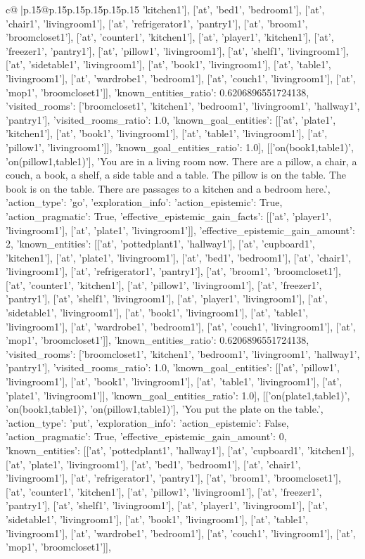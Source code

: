 \documentclass{article}
\begin{document}
{\begin{supertabular}{c@{$\;$}|p{.15\linewidth}@{}p{.15\linewidth}p{.15\linewidth}p{.15\linewidth}p{.15\linewidth}p{.15\linewidth}}
{{{'kitchen1'], ['at', 'bed1', 'bedroom1'], ['at', 'chair1', 'livingroom1'], ['at', 'refrigerator1', 'pantry1'], ['at', 'broom1', 'broomcloset1'], ['at', 'counter1', 'kitchen1'], ['at', 'player1', 'kitchen1'], ['at', 'freezer1', 'pantry1'], ['at', 'pillow1', 'livingroom1'], ['at', 'shelf1', 'livingroom1'], ['at', 'sidetable1', 'livingroom1'], ['at', 'book1', 'livingroom1'], ['at', 'table1', 'livingroom1'], ['at', 'wardrobe1', 'bedroom1'], ['at', 'couch1', 'livingroom1'], ['at', 'mop1', 'broomcloset1']], 'known_entities_ratio': 0.6206896551724138, 'visited_rooms': ['broomcloset1', 'kitchen1', 'bedroom1', 'livingroom1', 'hallway1', 'pantry1'], 'visited_rooms_ratio': 1.0, 'known_goal_entities': [['at', 'plate1', 'kitchen1'], ['at', 'book1', 'livingroom1'], ['at', 'table1', 'livingroom1'], ['at', 'pillow1', 'livingroom1']], 'known_goal_entities_ratio': 1.0}}], [['on(book1,table1)', 'on(pillow1,table1)'], 'You are in a living room now. There are a pillow, a chair, a couch, a book, a shelf, a side table and a table. The pillow is on the table. The book is on the table. There are passages to a kitchen and a bedroom here.', {'action_type': 'go', 'exploration_info': {'action_epistemic': True, 'action_pragmatic': True, 'effective_epistemic_gain_facts': [['at', 'player1', 'livingroom1'], ['at', 'plate1', 'livingroom1']], 'effective_epistemic_gain_amount': 2, 'known_entities': [['at', 'pottedplant1', 'hallway1'], ['at', 'cupboard1', 'kitchen1'], ['at', 'plate1', 'livingroom1'], ['at', 'bed1', 'bedroom1'], ['at', 'chair1', 'livingroom1'], ['at', 'refrigerator1', 'pantry1'], ['at', 'broom1', 'broomcloset1'], ['at', 'counter1', 'kitchen1'], ['at', 'pillow1', 'livingroom1'], ['at', 'freezer1', 'pantry1'], ['at', 'shelf1', 'livingroom1'], ['at', 'player1', 'livingroom1'], ['at', 'sidetable1', 'livingroom1'], ['at', 'book1', 'livingroom1'], ['at', 'table1', 'livingroom1'], ['at', 'wardrobe1', 'bedroom1'], ['at', 'couch1', 'livingroom1'], ['at', 'mop1', 'broomcloset1']], 'known_entities_ratio': 0.6206896551724138, 'visited_rooms': ['broomcloset1', 'kitchen1', 'bedroom1', 'livingroom1', 'hallway1', 'pantry1'], 'visited_rooms_ratio': 1.0, 'known_goal_entities': [['at', 'pillow1', 'livingroom1'], ['at', 'book1', 'livingroom1'], ['at', 'table1', 'livingroom1'], ['at', 'plate1', 'livingroom1']], 'known_goal_entities_ratio': 1.0}}], [['on(plate1,table1)', 'on(book1,table1)', 'on(pillow1,table1)'], 'You put the plate on the table.', {'action_type': 'put', 'exploration_info': {'action_epistemic': False, 'action_pragmatic': True, 'effective_epistemic_gain_amount': 0, 'known_entities': [['at', 'pottedplant1', 'hallway1'], ['at', 'cupboard1', 'kitchen1'], ['at', 'plate1', 'livingroom1'], ['at', 'bed1', 'bedroom1'], ['at', 'chair1', 'livingroom1'], ['at', 'refrigerator1', 'pantry1'], ['at', 'broom1', 'broomcloset1'], ['at', 'counter1', 'kitchen1'], ['at', 'pillow1', 'livingroom1'], ['at', 'freezer1', 'pantry1'], ['at', 'shelf1', 'livingroom1'], ['at', 'player1', 'livingroom1'], ['at', 'sidetable1', 'livingroom1'], ['at', 'book1', 'livingroom1'], ['at', 'table1', 'livingroom1'], ['at', 'wardrobe1', 'bedroom1'], ['at', 'couch1', 'livingroom1'], ['at', 'mop1', 'broomcloset1']], }}}
\end{supertabular}}
\end{document}

